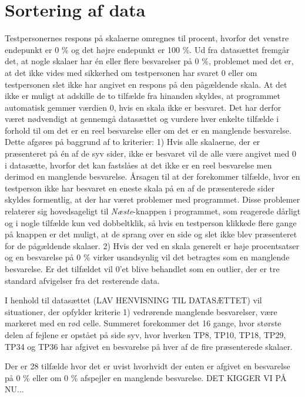 \section{Sortering af data}
\label{TestAfSkalaSorteringAfData}
%
%
Testpersonernes respons på skalaerne omregnes til procent, hvorfor det venstre endepunkt er 0 \% og det højre endepunkt er 100 \%. Ud fra datasættet fremgår det, at nogle skalaer har én eller flere besvarelser på 0 \%, problemet med det er, at det ikke vides med sikkerhed om testpersonen har svaret 0 eller om testpersonen slet ikke har angivet en respons på den pågældende skala. At det ikke er muligt at adskille de to tilfælde fra hinanden skyldes, at programmet automatisk gemmer værdien 0, hvis en skala ikke er besvaret. Det har derfor været nødvendigt at gennemgå datasættet og vurdere hver enkelte tilfælde i forhold til om det er en reel besvarelse eller om det er en manglende besvarelse. Dette afgøres på baggrund af to kriterier: 1) Hvis alle skalaerne, der er præsenteret på én af de syv sider, ikke er besvaret vil de alle være angivet med 0 i datasætte, hvorfor det kan fastslåes at det ikke er en reel besvarelse men derimod en manglende besvarelse. Årsagen til at der forekommer tilfælde, hvor en testperson ikke har besvaret en eneste skala på en af de præsenterede sider skyldes formentlig, at der har været problemer med programmet. Disse problemer relaterer sig hovedsageligt til \textit{Næste}-knappen i programmet, som reagerede dårligt og i nogle tilfælde kun ved dobbeltklik, så hvis en testperson klikkede flere gange på knappen er det muligt, at de sprang over en side og slet ikke blev præsenteret for de pågældende skalaer. 2) Hvis der ved en skala generelt er høje procentsatser og en besvarelse på 0 \% virker usandsynlig vil det betragtes som en manglende besvarelse. Er det tilfældet vil 0'et blive behandlet som en outlier, der er tre standard afvigelser fra det resterende data.

I henhold til datasættet (LAV HENVISNING TIL DATASÆTTET) vil situationer, der opfylder kriterie 1) vedrørende manglende besvarelser, være markeret med en rød celle. Summeret forekommer det 16 gange, hvor største delen af fejlene er opstået på side syv, hvor hverken TP8, TP10, TP18, TP29, TP34 og TP36 har afgivet en besvarelse på hver af de fire præsenterede skalaer. 

Der er 28 tilfælde hvor det er uvist hvorhvidt der enten er afgivet en besvarelse på 0 \% eller om 0 \% afspejler en manglende besvarelse. DET KIGGER VI PÅ NU... 

 

  

